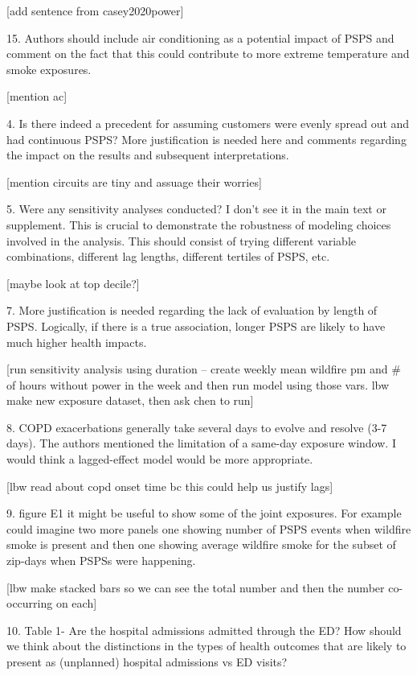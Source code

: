 [add sentence from casey2020power]

15.      Authors should include air conditioning as a potential impact of PSPS and comment on the fact that this could contribute to more extreme temperature and smoke exposures.

[mention ac]

4.      Is there indeed a precedent for assuming customers were evenly spread out and had continuous PSPS? More justification is needed here and comments regarding the impact on the results and subsequent interpretations.

[mention circuits are tiny and assuage their worries]

5.      Were any sensitivity analyses conducted? I don’t see it in the main text or supplement. This is crucial to demonstrate the robustness of modeling choices involved in the analysis. This should consist of trying different variable combinations, different lag lengths, different tertiles of PSPS, etc.

[maybe look at top decile?]

7.      More justification is needed regarding the lack of evaluation by length of PSPS. Logically, if there is a true association, longer PSPS are likely to have much higher health impacts.

[run sensitivity analysis using duration -- create weekly mean wildfire pm and # of hours without power in the week and then run model using those vars. lbw make new exposure dataset, then ask chen to run]

8. COPD exacerbations generally take several days to evolve and resolve (3-7 days). The authors mentioned the limitation of a same-day exposure window. I would think a lagged-effect model would be more appropriate.

[lbw read about copd onset time bc this could help us justify lags]

9.   figure E1 it might be useful to show some of the joint exposures. For example could imagine two more panels one showing number of PSPS events when wildfire smoke is present and then one showing average wildfire smoke for the subset of zip-days when PSPSs were happening.

[lbw make stacked bars so we can see the total number and then the number co-occurring on each]

10.  Table 1- Are the hospital admissions admitted through the ED? How should we think about the distinctions in the types of health outcomes that are likely to present as (unplanned) hospital admissions vs ED visits?

